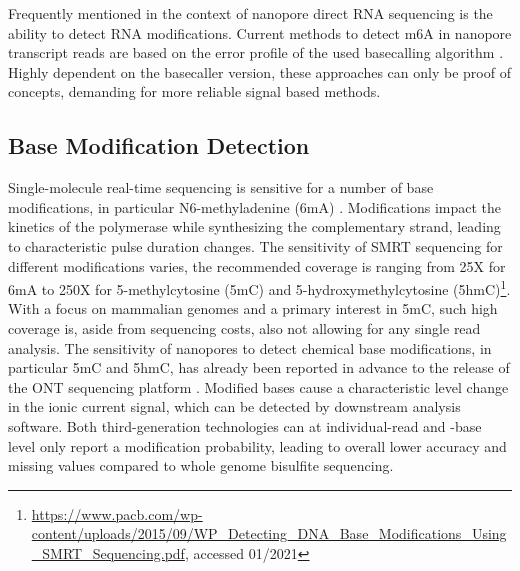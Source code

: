 Frequently mentioned in the context of nanopore direct RNA sequencing is the ability to detect RNA modifications.
Current methods to detect m6A in nanopore transcript reads are based on the error profile of the used basecalling algorithm \cite{Liu2019, Parker2020}.
Highly dependent on the basecaller version, these approaches can only be proof of concepts, demanding for more reliable signal based methods.




\subsection{Base Modification Detection}
\label{subsec:state_of_art:basemod}

Single-molecule real-time sequencing is sensitive for a number of base modifications, in particular N6-methyladenine (6mA) \cite{Flusberg2010}.
Modifications impact the kinetics of the polymerase while synthesizing the complementary strand, leading to characteristic pulse duration changes.
The sensitivity of SMRT sequencing for different modifications varies, the recommended coverage is ranging from 25X for 6mA to 250X for 5-methylcytosine (5mC) and 5-hydroxymethylcytosine (5hmC)\footnote{\url{https://www.pacb.com/wp-content/uploads/2015/09/WP_Detecting_DNA_Base_Modifications_Using_SMRT_Sequencing.pdf}, accessed 01/2021}.
With a focus on mammalian genomes and a primary interest in 5mC, such high coverage is, aside from sequencing costs, also not allowing for any single read analysis.
The sensitivity of nanopores to detect chemical base modifications, in particular 5mC and 5hmC, has already been reported in advance to the release of the ONT sequencing platform \cite{Laszlo2013, Schreiber2013}.
Modified bases cause a characteristic level change in the ionic current signal, which can be detected by downstream analysis software.
Both third-generation technologies can at individual-read and -base level only report a modification probability, leading to overall lower accuracy and missing values compared to whole genome bisulfite sequencing.

